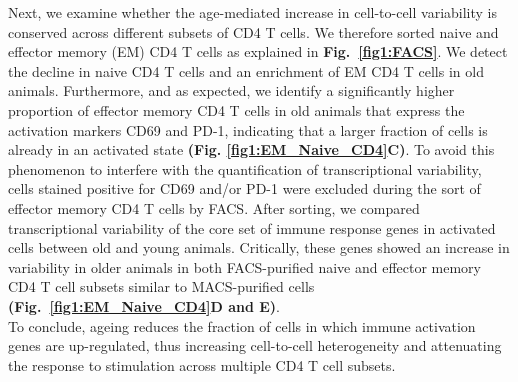 Next, we examine whether the age-mediated increase in cell-to-cell variability is conserved across different subsets of CD4\plus{} T cells. We therefore sorted naive and effector memory (EM) CD4\plus{} T cells as explained in \textbf{Fig.~\ref{fig1:FACS}}. We detect the decline in naive CD4\plus{} T cells and an enrichment of EM CD4\plus{} T cells in old animals. Furthermore, and as expected, we identify a significantly higher proportion of effector memory CD4\plus{} T cells in old animals that express the activation markers CD69 and PD-1, indicating that a larger fraction of cells is already in an activated state \textbf{(Fig. \ref{fig1:EM_Naive_CD4}C)}. To avoid this phenomenon to interfere with the quantification of transcriptional variability, cells stained positive for CD69 and/or PD-1 were excluded during the sort of effector memory CD4\plus{} T cells by FACS. After sorting, we compared transcriptional variability of the core set of immune response genes in activated cells between old and young animals. Critically, these genes showed an increase in variability in older animals in both FACS-purified naive and effector memory CD4\plus{} T cell subsets similar to MACS-purified cells  \textbf{(Fig.~\ref{fig1:EM_Naive_CD4}D and E)}.\\

To conclude, ageing reduces the fraction of cells in which immune activation genes are up-regulated, thus increasing cell-to-cell heterogeneity and attenuating the response to stimulation across multiple CD4\plus{} T cell subsets.

\newpage

